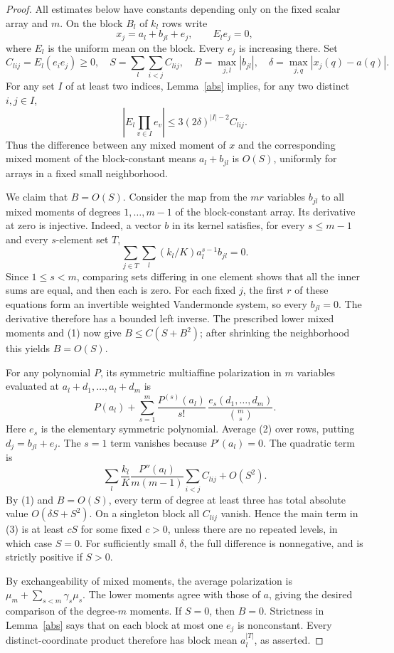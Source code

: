 \documentclass[11pt]{article}
\begin{document}
\begin{proof}
All estimates below have constants depending only on the fixed scalar
array and $m$. On the block $B_l$ of $k_l$ rows write
\[
 x_j=a_l+b_{jl}+e_j,\qquad E_l e_j=0,
\]
where $E_l$ is the uniform mean on the block. Every $e_j$ is increasing
there. Set
\[
 C_{lij}=E_l(e_ie_j)\ge0,
 \quad S=\sum_l\sum_{i<j}C_{lij},
 \quad B=\max_{j,l}|b_{jl}|,
 \quad \delta=\max_{j,q}|x_j(q)-a(q)|.
\]
For any set $I$ of at least two indices, Lemma~\ref{abs} implies, for
any two distinct $i,j\in I$,
\[
 \left|E_l\prod_{v\in I}e_v\right|
 \le3(2\delta)^{|I|-2}C_{lij}.
\tag{1}
\]
Thus the difference between any mixed moment of $x$ and the corresponding
mixed moment of the block-constant means $a_l+b_{jl}$ is $O(S)$,
uniformly for arrays in a fixed small neighborhood.

We claim that $B=O(S)$. Consider the map from the $mr$ variables $b_{jl}$
to all mixed moments of degrees $1,\ldots,m-1$ of the block-constant
array. Its derivative at zero is injective. Indeed, a vector $b$ in its
kernel satisfies, for every $s\le m-1$ and every $s$-element set $T$,
\[
 \sum_{j\in T}\sum_l(k_l/K)a_l^{s-1}b_{jl}=0.
\]
Since $1\le s<m$, comparing sets differing in one element shows that
all the inner sums are equal, and then each is zero. For each fixed $j$,
the first $r$ of these equations form an invertible weighted Vandermonde
system, so every $b_{jl}=0$. The derivative therefore has a bounded left
inverse. The prescribed lower mixed moments and (1) now give
$B\le C(S+B^2)$; after shrinking the neighborhood this yields $B=O(S)$.

For any polynomial $P$, its symmetric multiaffine polarization in $m$
variables evaluated at $a_l+d_1,\ldots,a_l+d_m$ is
\[
 P(a_l)+\sum_{s=1}^m
       \frac{P^{(s)}(a_l)}{s!}\,
       \frac{e_s(d_1,\ldots,d_m)}{\binom ms}.
\tag{2}
\]
Here $e_s$ is the elementary symmetric polynomial. Average (2) over
rows, putting $d_j=b_{jl}+e_j$. The $s=1$ term vanishes because
$P'(a_l)=0$. The quadratic term is
\[
 \sum_l\frac{k_l}{K}\frac{P''(a_l)}{m(m-1)}
       \sum_{i<j} C_{lij}+O(S^2).
\tag{3}
\]
By (1) and $B=O(S)$, every term of degree at least three has total
absolute value $O(\delta S+S^2)$. On a singleton block all $C_{lij}$
vanish. Hence the main term in (3) is at least $cS$ for some fixed
$c>0$, unless there are no repeated levels, in which case $S=0$.
For sufficiently small $\delta$, the full difference is nonnegative,
and is strictly positive if $S>0$.

By exchangeability of mixed moments, the average polarization is
$\mu_m+\sum_{s<m}\gamma_s\mu_s$. The lower moments agree with those of
$a$, giving the desired comparison of the degree-$m$ moments. If
$S=0$, then $B=0$. Strictness in Lemma~\ref{abs} says that on each
block at most one $e_j$ is nonconstant. Every distinct-coordinate
product therefore has block mean $a_l^{|T|}$, as asserted.
\end{proof}
\end{document}
